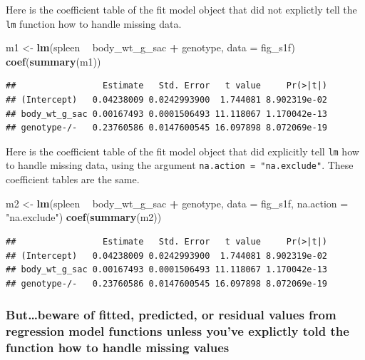 \documentclass[]{book}
\newenvironment{Shaded}{\begin{snugshade}}{\end{snugshade}}
\newcommand{\DataTypeTok}[1]{\textcolor[rgb]{0.13,0.29,0.53}{#1}}
\newcommand{\KeywordTok}[1]{\textcolor[rgb]{0.13,0.29,0.53}{\textbf{#1}}}
\newcommand{\NormalTok}[1]{#1}
\newcommand{\OperatorTok}[1]{\textcolor[rgb]{0.81,0.36,0.00}{\textbf{#1}}}
\newcommand{\StringTok}[1]{\textcolor[rgb]{0.31,0.60,0.02}{#1}}
\begin{document}
Here is the coefficient table of the fit model object that did not explictly tell the \texttt{lm} function how to handle missing data.

\begin{Shaded}
\begin{Highlighting}[]
\NormalTok{m1 <-}\StringTok{ }\KeywordTok{lm}\NormalTok{(spleen }\OperatorTok{~}\StringTok{ }\NormalTok{body_wt_g_sac }\OperatorTok{+}\StringTok{ }\NormalTok{genotype,}
         \DataTypeTok{data =}\NormalTok{ fig_s1f)}
\KeywordTok{coef}\NormalTok{(}\KeywordTok{summary}\NormalTok{(m1))}
\end{Highlighting}
\end{Shaded}

\begin{verbatim}
##                 Estimate   Std. Error   t value     Pr(>|t|)
## (Intercept)   0.04238009 0.0242993900  1.744081 8.902319e-02
## body_wt_g_sac 0.00167493 0.0001506493 11.118067 1.170042e-13
## genotype-/-   0.23760586 0.0147600545 16.097898 8.072069e-19
\end{verbatim}

Here is the coefficient table of the fit model object that did explicitly tell \texttt{lm} how to handle missing data, using the argument \texttt{na.action\ =\ "na.exclude"}. These coefficient tables are the same.

\begin{Shaded}
\begin{Highlighting}[]
\NormalTok{m2 <-}\StringTok{ }\KeywordTok{lm}\NormalTok{(spleen }\OperatorTok{~}\StringTok{ }\NormalTok{body_wt_g_sac }\OperatorTok{+}\StringTok{ }\NormalTok{genotype,}
         \DataTypeTok{data =}\NormalTok{ fig_s1f,}
         \DataTypeTok{na.action =} \StringTok{"na.exclude"}\NormalTok{)}
\KeywordTok{coef}\NormalTok{(}\KeywordTok{summary}\NormalTok{(m2))}
\end{Highlighting}
\end{Shaded}

\begin{verbatim}
##                 Estimate   Std. Error   t value     Pr(>|t|)
## (Intercept)   0.04238009 0.0242993900  1.744081 8.902319e-02
## body_wt_g_sac 0.00167493 0.0001506493 11.118067 1.170042e-13
## genotype-/-   0.23760586 0.0147600545 16.097898 8.072069e-19
\end{verbatim}

\hypertarget{butbeware-of-fitted-predicted-or-residual-values-from-regression-model-functions-unless-youve-explictly-told-the-function-how-to-handle-missing-values}{%
\subsubsection{But\ldots beware of fitted, predicted, or residual values from regression model functions unless you've explictly told the function how to handle missing values}\label{butbeware-of-fitted-predicted-or-residual-values-from-regression-model-functions-unless-youve-explictly-told-the-function-how-to-handle-missing-values}}
\end{document}
